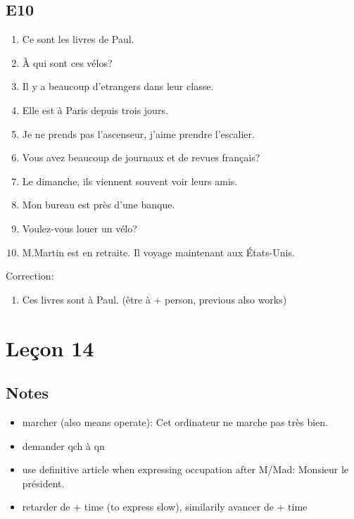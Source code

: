 \documentclass{book}
\begin{document}
    \section{E10}
        \begin{enumerate}
            \item Ce sont les livres de Paul.
            \item À qui sont ces vélos?
            \item Il y a beaucoup d'etrangers dans leur classe.
            \item Elle est à Paris depuis trois jours.
            \item Je ne prends pas l'ascenseur, j'aime prendre l'escalier.
            \item Vous avez beaucoup de journaux et de revues français?
            \item Le dimanche, ils viennent souvent voir leurs amis.
            \item Mon bureau est près d'une banque.
            \item Voulez-vous louer un vélo?
            \item M.Martin est en retraite. Il voyage maintenant aux États-Unis.
        \end{enumerate}
        Correction:
        \begin{enumerate}
            \item Ces livres sont à Paul. (être à + person, previous also works)
        \end{enumerate}

\chapter{Leçon 14}
    \section{Notes}
        \begin{itemize}
            \item marcher (also means operate): Cet ordinateur ne marche pas très bien.
            \item demander qch à qn
            \item use definitive article when expressing occupation after M/Mad: Monsieur le président.
            \item retarder de + time (to express slow), similarily avancer de + time
        \end{itemize}
    
\end{document}
